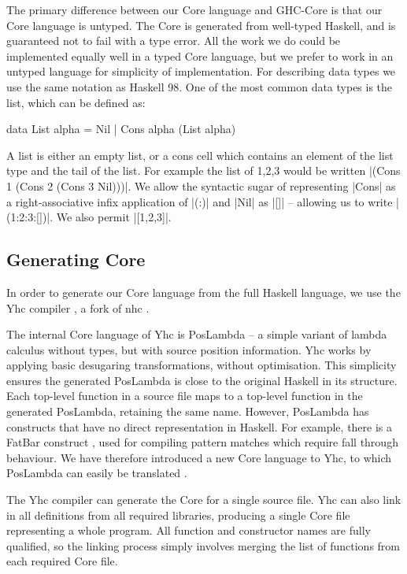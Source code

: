 The primary difference between our Core language and GHC-Core \cite{ghc_core} is that our Core language is untyped. The Core is generated from well-typed Haskell, and is guaranteed not to fail with a type error. All the work we do could be implemented equally well in a typed Core language, but we prefer to work in an untyped language for simplicity of implementation. For describing data types we use the same notation as Haskell 98. One of the most common data types is the list, which can be defined as:

\begin{code}
data List alpha = Nil | Cons alpha (List alpha)
\end{code}

A list is either an empty list, or a cons cell which contains an element of the list type and the tail of the list. For example the list of 1,2,3 would be written |(Cons 1 (Cons 2 (Cons 3 Nil)))|. We allow the syntactic sugar of representing |Cons| as a right-associative infix application of |(:)| and |Nil| as |[]| -- allowing us to write |(1:2:3:[])|. We also permit |[1,2,3]|.

\subsection{Generating Core}

In order to generate our Core language from the full Haskell language, we use the Yhc compiler \cite{yhc}, a fork of nhc \cite{nhc}.

The internal Core language of Yhc is PosLambda -- a simple variant of lambda calculus without types, but with source position information. Yhc works by applying basic desugaring transformations, without optimisation. This simplicity ensures the generated PosLambda is close to the original Haskell in its structure. Each top-level function in a source file maps to a top-level function in the generated PosLambda, retaining the same name. However, PosLambda has constructs that have no direct representation in Haskell. For example, there is a FatBar construct \cite{spj:implementation}, used for compiling pattern matches which require fall through behaviour. We have therefore introduced a new Core language to Yhc, to which PosLambda can easily be translated \cite{me:yhc_core}.

The Yhc compiler can generate the Core for a single source file. Yhc can also link in all definitions from all required libraries, producing a single Core file representing a whole program. All function and constructor names are fully qualified, so the linking process simply involves merging the list of functions from each required Core file.

